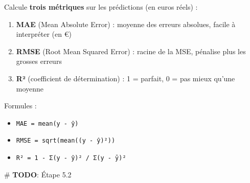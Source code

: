 \documentclass[
  french,
  11pt,
  a4paper,
]{scrbook}
\newenvironment{Shaded}{}{}
\newcommand{\AlertTok}[1]{\textcolor[rgb]{1.00,0.33,0.33}{\textbf{#1}}}
\newcommand{\CommentTok}[1]{\textcolor[rgb]{0.42,0.45,0.49}{#1}}
\providecommand{\tightlist}{%
  \setlength{\itemsep}{0pt}\setlength{\parskip}{0pt}}
\begin{document}
\begin{tcolorbox}[enhanced jigsaw, arc=.35mm, bottomrule=.15mm, bottomtitle=1mm, breakable, colback=white, colbacktitle=quarto-callout-note-color!10!white, colframe=quarto-callout-note-color-frame, coltitle=black, left=2mm, leftrule=.75mm, opacityback=0, opacitybacktitle=0.6, rightrule=.15mm, title={📝 À faire}, titlerule=0mm, toprule=.15mm, toptitle=1mm]

Calcule \textbf{trois métriques} sur les prédictions (en euros réels) :

\begin{enumerate}
\def\labelenumi{\arabic{enumi}.}
\tightlist
\item
  \textbf{MAE} (Mean Absolute Error) : moyenne des erreurs absolues,
  facile à interpréter (en €)
\item
  \textbf{RMSE} (Root Mean Squared Error) : racine de la MSE, pénalise
  plus les grosses erreurs
\item
  \textbf{R²} (coefficient de détermination) : 1 = parfait, 0 = pas
  mieux qu'une moyenne
\end{enumerate}

Formules :

\begin{itemize}
\tightlist
\item
  \texttt{MAE\ =\ mean(\textbar{}y\ -\ ŷ\textbar{})}
\item
  \texttt{RMSE\ =\ sqrt(mean((y\ -\ ŷ)²))}
\item
  \texttt{R²\ =\ 1\ -\ Σ(y\ -\ ŷ)²\ /\ Σ(y\ -\ ȳ)²}
\end{itemize}

\end{tcolorbox}

\begin{Shaded}
\begin{Highlighting}[]
\CommentTok{\# }\AlertTok{TODO}\CommentTok{: Étape 5.2}
\end{Highlighting}
\end{Shaded}
\end{document}
